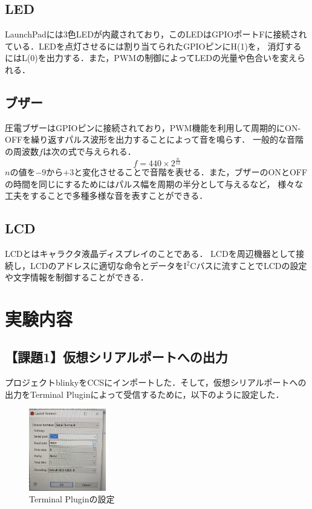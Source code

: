\documentclass{jlreq}
\begin{document}
\subsection{LED}
LaunchPadには3色LEDが内蔵されており，このLEDはGPIOポートFに接続されている．LEDを点灯させるには割り当てられたGPIOピンにH(1)を，
消灯するにはL(0)を出力する．また，PWMの制御によってLEDの光量や色合いを変えられる．

\subsection{ブザー}
圧電ブザーはGPIOピンに接続されており，PWM機能を利用して周期的にON-OFFを繰り返すパルス波形を出力することによって音を鳴らす．
一般的な音階の周波数$f$は次の式で与えられる．
\begin{equation}
  f=440\times2^{\frac{n}{12}}
\end{equation}
$n$の値を$-9$から$+3$と変化させることで音階を表せる．また，ブザーのONとOFFの時間を同じにするためにはパルス幅を周期の半分として与えるなど，
様々な工夫をすることで多種多様な音を表すことができる．

\subsection{LCD}
LCDとはキャラクタ液晶ディスプレイのことである．
LCDを周辺機器として接続し，LCDのアドレスに適切な命令とデータをI$^2$Cバスに流すことでLCDの設定や文字情報を制御することができる．

\section{実験内容}

\subsection{【課題1】仮想シリアルポートへの出力}
プロジェクトblinkyをCCSにインポートした．そして，仮想シリアルポートへの出力をTerminal Pluginによって受信するために，以下のように設定した．
\begin{figure}
  \centering
  \includegraphics[width=0.3\textwidth]{mysetting.jpg}
  \caption{Terminal Pluginの設定}
  \label{fig:Terminal_Plugin}
\end{figure}
\end{document}
